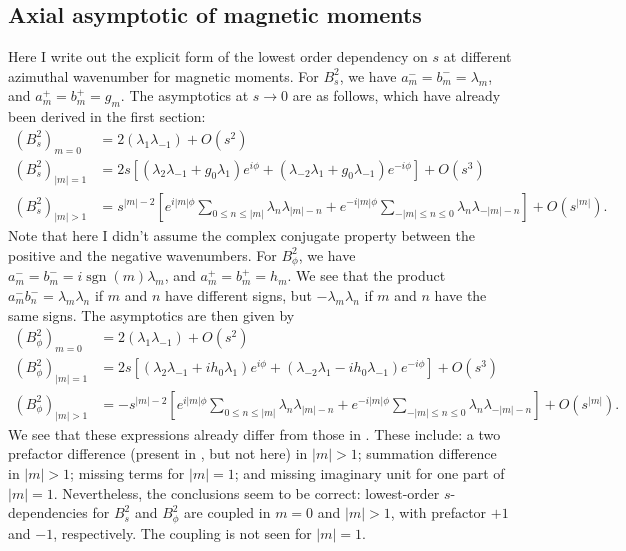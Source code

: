 \documentclass[a4paper, 11pt]{article}
\DeclareMathOperator{\sgn}{sgn}
\begin{document}
\subsection{Axial asymptotic of magnetic moments}

Here I write out the explicit form of the lowest order dependency on $s$ at different azimuthal wavenumber for magnetic moments. For $B_s^2$, we have $a_m^- = b_m^- = \lambda_m$, and $a_m^+ = b_m^+ = g_m$. The asymptotics at $s\rightarrow 0$ are as follows, which have already been derived in the first section:
\begin{equation}
\begin{aligned}
    \left(B_s^2\right)_{m=0} &= 2(\lambda_1 \lambda_{-1}) + O\left(s^2\right) \\ 
    \left(B_s^2\right)_{|m|=1} &= 2 s \left[\left(\lambda_2 \lambda_{-1} + g_0 \lambda_1\right) e^{i\phi} + \left(\lambda_{-2} \lambda_{1} + g_0 \lambda_{-1}\right) e^{-i\phi}\right] + O\left(s^3\right) \\ 
    \left(B_s^2\right)_{|m|>1} &= s^{|m|-2} \left[e^{i|m|\phi} \sum_{0\leq n \leq |m|} \lambda_n \lambda_{|m|-n} + e^{-i|m|\phi} \sum_{-|m|\leq n\leq 0} \lambda_n \lambda_{-|m|-n}\right] + O\left(s^{|m|}\right).
\end{aligned}
\end{equation}
Note that here I didn't assume the complex conjugate property between the positive and the negative wavenumbers. For $B_\phi^2$, we have $a_m^- = b_m^- = i\sgn(m)\lambda_m$, and $a_m^+ = b_m^+ = h_m$. We see that the product $a_m^- b_n^- = \lambda_m \lambda_n$ if $m$ and $n$ have different signs, but $-\lambda_m \lambda_n$ if $m$ and $n$ have the same signs. The asymptotics are then given by
\begin{equation}
    \begin{aligned}
        \left(B_\phi^2\right)_{m=0} &= 2 (\lambda_1 \lambda_{-1}) + O\left(s^2\right) \\ 
        \left(B_\phi^2\right)_{|m|=1} &= 2 s \left[\left(\lambda_2 \lambda_{-1} + i h_0 \lambda_1\right) e^{i\phi} + \left(\lambda_{-2} \lambda_{1} - i h_0 \lambda_{-1}\right) e^{-i\phi}\right] + O\left(s^3\right) \\ 
        \left(B_\phi^2\right)_{|m|>1} &= -s^{|m|-2} \left[e^{i|m|\phi} \sum_{0\leq n \leq |m|} \lambda_n \lambda_{|m|-n} + e^{-i|m|\phi} \sum_{-|m|\leq n\leq 0} \lambda_n \lambda_{-|m|-n}\right] + O\left(s^{|m|}\right).
\end{aligned}
\end{equation}
We see that these expressions already differ from those in \textcite{holdenried-chernoff_long_2021}. These include: a two prefactor difference (present in \cite{holdenried-chernoff_long_2021}, but not here) in $|m| > 1$; summation difference in $|m| > 1$; missing terms for $|m|=1$; and missing imaginary unit for one part of $|m|=1$. Nevertheless, the conclusions seem to be correct: lowest-order $s$-dependencies for $B_s^2$ and $B_\phi^2$ are coupled in $m=0$ and $|m|>1$, with prefactor $+1$ and $-1$, respectively. The coupling is not seen for $|m|=1$.
\end{document}
